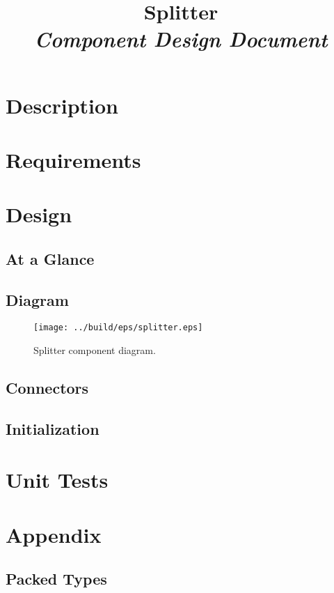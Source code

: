 



\title{\textbf{Splitter} \\
\large\textit{Component Design Document}}
\date{}
\maketitle

\section{Description}


\section{Requirements}


\section{Design}

\subsection{At a Glance}


\subsection{Diagram}
\begin{figure}[H]
  \texttt{[image: ../build/eps/splitter.eps]}
  \caption{Splitter component diagram.}
\end{figure}

\subsection{Connectors}


\subsection{Initialization}


\section{Unit Tests}



\section{Appendix}
\subsection{Packed Types}




